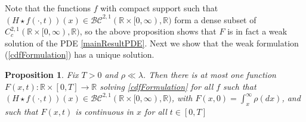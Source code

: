 \documentclass{article}
\newtheorem{propn}[theorem]{Proposition}
\newcommand{\B}[1]{\mathbb{#1}}
\newcommand{\C}[1]{\mathcal{#1}}
\begin{document}
Note that the functions $f$ with compact support such that $(H\star f(\cdot,t))(x)\in \C{BC}^{2,1}(\B{R}\times [0,\infty),\B{R})$ form a dense subset of $C^{2,1}_c(\B{R}\times [0,\infty),\B{R})$, so the above proposition shows that $F$ is in fact a weak solution of the PDE \eqref{mainResultPDE}. Next we show that the weak formulation (\ref{cdfFormulation}) has a unique solution.

\vspace{1em}

\begin{propn} \label{Uniqueness}
    Fix $T>0$ and $\rho\ll\lambda$. Then there is at most one function $F(x,t):\B{R}\times [0,T]\to\B{R}$ solving \eqref{cdfFormulation} for all $f$ such that $(H\star f(\cdot,t))(x)\in\C{BC}^{2,1}(\B{R}\times [0,\infty),\B{R})$, with $F(x,0)=\int_{x}^\infty \rho(dx)$, and such that $F(x,t)$ is continuous in $x$ for all $t\in [0,T]$
\end{propn}
\end{document}
